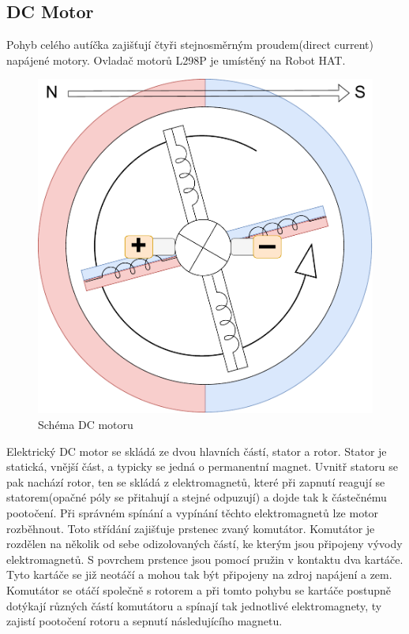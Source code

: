 \newpage
\subsection*{DC Motor}
Pohyb celého autíčka zajišťují čtyři stejnosměrným proudem(direct current) napájené motory. Ovladač motorů L298P je umístěný na Robot HAT.

\begin{figure}[h!]
	\centering
	\includegraphics[scale=0.50]{obrazky-figures/dc_motor.pdf}
	\caption{Schéma DC motoru}
	\label{}
\end{figure}

Elektrický DC motor se skládá ze dvou hlavních částí, stator a rotor. Stator je statická, vnější část, a typicky se jedná o permanentní magnet. Uvnitř statoru se pak nachází rotor, ten se skládá z elektromagnetů, které při zapnutí reagují se statorem(opačné póly se přitahují a stejné odpuzují) a dojde tak k částečnému pootočení. Při správném spínání a vypínání těchto elektromagnetů lze motor rozběhnout. 
Toto střídání zajišťuje prstenec zvaný komutátor. Komutátor je rozdělen na několik od sebe odizolovaných částí, ke kterým jsou připojeny vývody elektromagnetů. S povrchem prstence jsou pomocí pružin v kontaktu dva kartáče. Tyto kartáče se již neotáčí a mohou tak být připojeny na zdroj napájení a zem. Komutátor se otáčí společně s rotorem a při tomto pohybu se kartáče postupně dotýkají různých částí komutátoru a spínají tak jednotlivé elektromagnety, ty zajistí pootočení rotoru a sepnutí následujícího magnetu. \cite{dc_motor}

